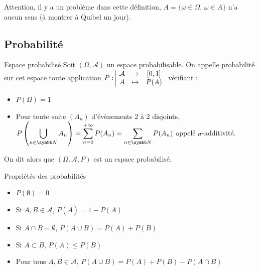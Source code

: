 Attention, il y a un problème dans cette définition, $A = \{ \omega \in \Omega, \, \omega \in A\}$ 
n'a aucun sens (à montrer à Quibel un jour).

\subsection{Probabilité}

\begin{definition}{Espace probabilisé}{}
    Soit $(\Omega, \mathcal A)$ un espace probabilisable. On appelle probabilité 
    sur cet espace toute application $P: \space \begin{array}{|ccc} \displaystyle \mathcal A & \to & \displaystyle [0, 1] \\ \displaystyle A & \mapsto & \displaystyle P(A) \end{array}$
    vérifiant :
    \begin{itemize}
        \item $P(\Omega) = 1$
        \item Pour toute suite $(A_n)$ d'évènements 2 à 2 disjoints, 
        $\displaystyle P\left( \bigcup_{n \in \N} A_n \right) = \sum_{n = 0 }^{+\infty    } P(A_n ) = \sum_{n \in \N    } P(A_n)$
        appelé $\sigma$-additivité.
    \end{itemize}

    On dit alors que $(\Omega, \mathcal A, P)$ est un espace probabilisé. 
\end{definition}

\begin{proposition}{Propriétés des probabilités}{}
    \begin{itemize}
        \item $P(\emptyset) = 0$
        \item Si $A, B \in \mathcal A$, $P(\bar A) = 1 - P(A)$
        \item Si $A \cap B = \emptyset$, $P(A \cup B) = P(A) + P(B)$
        \item Si $A \subset B$, $P(A) \leqslant P(B)$
        \item Pour tous $A, B \in \mathcal A$, $P(A \cup B) = P(A) + P(B) - P(A \cap B)$
    \end{itemize}
\end{proposition}

